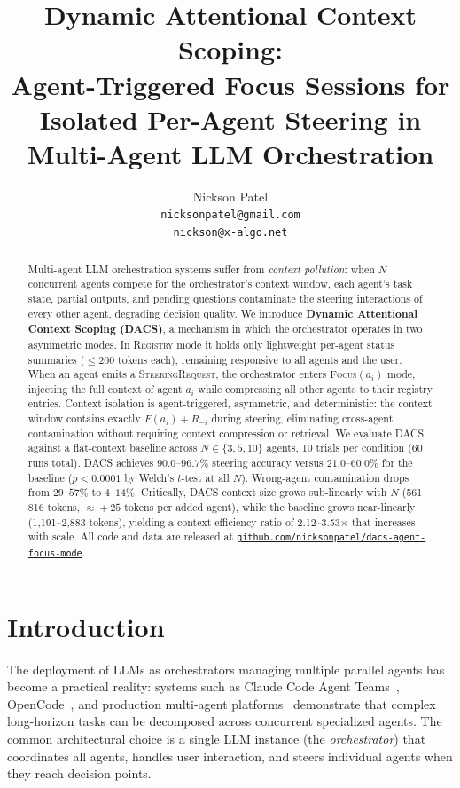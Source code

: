 \documentclass{article}
\title{Dynamic Attentional Context Scoping:\\
Agent-Triggered Focus Sessions for\\
Isolated Per-Agent Steering in Multi-Agent LLM Orchestration}
\author{%
  Nickson Patel \\
  \texttt{nicksonpatel@gmail.com} \\
  \texttt{nickson@x-algo.net}
}
\begin{document}
\maketitle

\begin{abstract}
Multi-agent LLM orchestration systems suffer from \emph{context pollution}:
when $N$ concurrent agents compete for the orchestrator's context window,
each agent's task state, partial outputs, and pending questions contaminate
the steering interactions of every other agent, degrading decision quality.
We introduce \textbf{Dynamic Attentional Context Scoping (DACS)}, a
mechanism in which the orchestrator operates in two asymmetric modes.
In \textsc{Registry} mode it holds only lightweight per-agent status
summaries ($\leq 200$ tokens each), remaining responsive to all agents
and the user.
When an agent emits a \textsc{SteeringRequest}, the orchestrator enters
\textsc{Focus}$(a_i)$ mode, injecting the full context of agent $a_i$
while compressing all other agents to their registry entries.
Context isolation is agent-triggered, asymmetric, and deterministic:
the context window contains exactly $F(a_i) + R_{-i}$ during steering,
eliminating cross-agent contamination without requiring context
compression or retrieval.
We evaluate DACS against a flat-context baseline across $N \in \{3, 5,
10\}$ agents, 10 trials per condition (60 runs total).
DACS achieves $90.0$--$96.7\%$ steering accuracy versus $21.0$--$60.0\%$
for the baseline ($p < 0.0001$ by Welch's $t$-test at all $N$).
Wrong-agent contamination drops from $29$--$57\%$ to $4$--$14\%$.
Critically, DACS context size grows sub-linearly with $N$ (561--816
tokens, $\approx\!+25$ tokens per added agent), while the baseline grows
near-linearly (1{,}191--2{,}883 tokens), yielding a context efficiency
ratio of 2.12--3.53$\times$ that increases with scale.
All code and data are released at
\href{https://github.com/nicksonpatel/dacs-agent-focus-mode}{\texttt{github.com/nicksonpatel/dacs-agent-focus-mode}}.
\end{abstract}

\section{Introduction}
\label{sec:intro}

The deployment of LLMs as orchestrators managing multiple parallel agents
has become a practical reality: systems such as Claude Code Agent
Teams~\citep{anthropic2025code}, OpenCode~\citep{opencode2025}, and
production multi-agent platforms~\citep{agentorchestra2025} demonstrate
that complex long-horizon tasks can be decomposed across concurrent
specialized agents.
The common architectural choice is a single LLM instance (the
\emph{orchestrator}) that coordinates all agents, handles user
interaction, and steers individual agents when they reach decision points.
\end{document}
